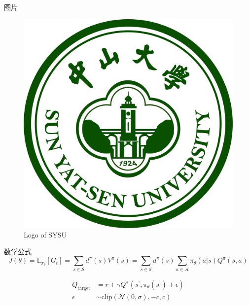 \documentclass{libs/format}
\begin{document}
\begin{frame}{图片}
  \begin{figure}
      \centering
      \caption{Logo of SYSU}
      \includegraphics[scale=0.05]{libs/sysu_big_logo.jpeg}
  \end{figure}
\end{frame}

\begin{frame}{数学公式}
  \begin{equation*}
    J(\theta) = \mathbb{E}_{\pi_\theta}[G_t] = \sum_{s\in\mathcal{S}} d^\pi (s)V^\pi(s)=\sum_{s\in\mathcal{S}} d^\pi(s)\sum_{a\in\mathcal{A}}\pi_\theta(a|s)Q^\pi(s,a)
  \end{equation*}
      
  \begin{align}
    Q_\mathrm{target}&=r+\gamma Q^\pi(s^\prime, \pi_\theta(s^\prime)+\epsilon)\\
          \epsilon&\sim\mathrm{clip}(\mathcal{N}(0, \sigma), -c, c)\nonumber
  \end{align}
\end{frame}
\end{document}
